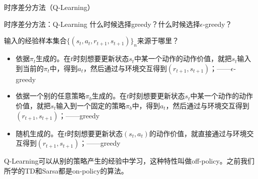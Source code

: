 \begin{section}{时序差分方法\alert{（Q-Learning）}}
\begin{frame}{时序差分方法：Q-Learning}
    什么时候选择greedy？什么时候选择$\epsilon$-greedy？
    
    输入的经验样本集合$\{(s_t, a_t, r_{t+1}, s_{t+1})\}_n$来源于哪里？
    \begin{itemize}
        \item 依据$\pi_t$生成的。在$t$时刻想要更新状态$s_t$中某一个动作的动作价值，就把$s_t$输入到当前的$\pi_t$中，得到$a_t$，然后通过与环境交互得到$(r_{t+1},s_{t+1})$；\alert{——{$\epsilon$}-greedy}
        \item 依据一个别的任意策略$\pi_b$生成的。在$t$时刻想要更新状态$s_t$中某一个动作的动作价值，就把$s_t$输入到一个固定的策略$\pi_b$中，得到$a_t$，然后通过与环境交互得到$(r_{t+1},s_{t+1})$；\alert{——greedy}
        \item 随机生成的。在$t$时刻想要更新状态$(s_t,a_t)$的动作价值，就直接通过与环境交互得到$(r_{t+1},s_{t+1})$；\alert{——greedy}
    \end{itemize}
    Q-Learning可以从别的策略产生的经验中学习，这种特性叫做off-policy。之前我们所学的TD和Sarsa都是on-policy的算法。
\end{frame}


\end{section}
